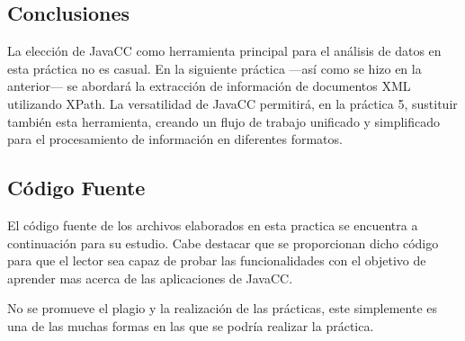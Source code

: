 \subsection{Conclusiones}



La elección de JavaCC como herramienta principal para el análisis de datos en esta práctica no es casual. En la siguiente práctica ---así como se hizo en la anterior--- se abordará la extracción de información de documentos XML utilizando XPath. La versatilidad de JavaCC permitirá, en la práctica 5, sustituir también esta herramienta, creando un flujo de trabajo unificado y simplificado para el procesamiento de información en diferentes formatos.



\subsection{Código Fuente}

\noindent El código fuente de los archivos elaborados en esta practica se encuentra a continuación para su estudio. Cabe destacar que se proporcionan dicho código para que el lector sea capaz de probar las funcionalidades con el objetivo de aprender mas acerca de las aplicaciones de JavaCC.

No se promueve el plagio y la realización de las prácticas, este simplemente es una de las muchas formas en las que se podría realizar la práctica.

